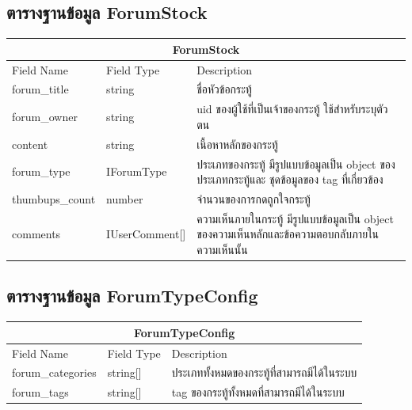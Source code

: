 \subsection{ตารางฐานข้อมูล ForumStock}
\begin{table}[H]
  \begin{tabular*}{\textwidth}{l|l|p{}}
  \hline
    \multicolumn{3}{c}{ForumStock}  \\ \hline                                                                                                     
    Field Name      & Field Type         & Description                                                                             \\\hline
    forum\_title    & string             & ชื่อหัวข้อกระทู้                                                                                \\
    forum\_owner    & string             & uid ของผู้ใช้ที่เป็นเจ้าของกระทู้ ใช้สำหรับระบุตัวตน                                            \\
    content         & string             & เนื้อหาหลักของกระทู้                                                                            \\
    forum\_type     & IForumType         & ประเภทของกระทู้ มีรูปแบบข้อมูลเป็น object ของประเภทกระทู้และ ชุดข้อมูลของ tag ที่เกี่ยวข้อง     \\
    thumbups\_count & number             & จำนวนของการกดถูกใจกระทู้                                                                        \\
    comments        & IUserComment{[}{]} & ความเห็นภายในกระทู้ มีรูปแบบข้อมูลเป็น object ของความเห็นหลักและข้อความตอบกลับภายในความเห็นนั้น \\ \hline
  \end{tabular*}
\end{table}

\subsection{ตารางฐานข้อมูล ForumTypeConfig}
\begin{table}[H]
  \begin{tabular*}{\textwidth}{l|l|p{}}
  \hline
    \multicolumn{3}{c}{ForumTypeConfig}                                           \\\hline  
    Field Name        & Field Type   & Description                                \\\hline  
    forum\_categories & string{[}{]} & ประเภททั้งหมดของกระทู้ที่สามารถมีได้ในระบบ \\
    forum\_tags       & string{[}{]} & tag ของกระทู้ทั้งหมดที่สามารถมีได้ในระบบ \\ \hline  
  \end{tabular*}
\end{table}

